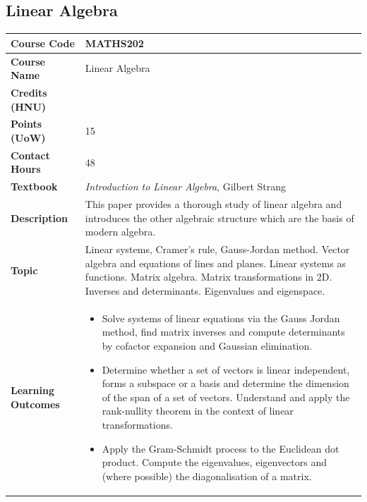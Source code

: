 \documentclass{article}
\begin{document}
\subsection[MATHS202 Linear Algebra]{Linear Algebra}
\renewcommand{\arraystretch}{1.5} %
\begin{longtable}{|p{3cm}|p{10cm}|}
\hline
\textbf{Course Code} & MATHS202 \\
\hline
\textbf{Course Name} & Linear Algebra\\
\hline
\textbf{Credits (HNU)} & \\
\hline
\textbf{Points (UoW)} & 15 \\
\hline
\textbf{Contact Hours} & 48 \\
\hline
\textbf{Textbook} & \emph{Introduction to Linear Algebra}, Gilbert Strang \\
\hline
\textbf{Description} & This paper provides a thorough study of linear algebra and introduces the other algebraic structure which are the basis of modern algebra. \\
\hline
\textbf{Topic} & Linear systems, Cramer's rule, Gauss-Jordan method. Vector algebra and equations of lines and planes. Linear systems as functions. Matrix algebra. Matrix transformations in 2D. Inverses and determinants. Eigenvalues and eigenspace. \\
\hline
\textbf{Learning Outcomes} & 
    \begin{itemize}
        \item Solve systems of linear equations via the Gauss Jordan method, find matrix inverses and compute determinants by cofactor expansion and Gaussian elimination.
        \item Determine whether a set of vectors is linear independent, forms a subspace or a basis and determine the dimension of the span of a set of vectors. Understand and apply the rank-nullity theorem in the context of linear transformations.
        \item Apply the Gram-Schmidt process to the Euclidean dot product. Compute the eigenvalues, eigenvectors and (where possible) the diagonalisation of a matrix.
    \end{itemize} \\
\hline
\end{longtable}
\end{document}
